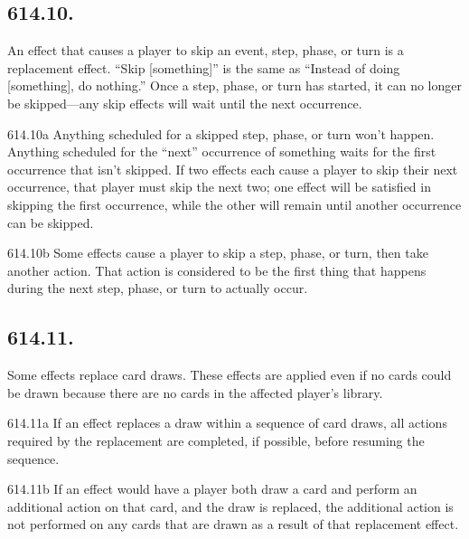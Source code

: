 \subsection*{614.10.}
An effect that causes a player to skip an event, step, phase, or turn is a replacement effect. “Skip [something]” is the same as “Instead of doing [something], do nothing.” Once a step, phase, or turn has started, it can no longer be skipped—any skip effects will wait until the next occurrence.

614.10a Anything scheduled for a skipped step, phase, or turn won’t happen. Anything scheduled for the “next” occurrence of something waits for the first occurrence that isn’t skipped. If two effects each cause a player to skip their next occurrence, that player must skip the next two; one effect will be satisfied in skipping the first occurrence, while the other will remain until another occurrence can be skipped.

614.10b Some effects cause a player to skip a step, phase, or turn, then take another action. That action is considered to be the first thing that happens during the next step, phase, or turn to actually occur.

\subsection*{614.11.}
Some effects replace card draws. These effects are applied even if no cards could be drawn because there are no cards in the affected player’s library.

614.11a If an effect replaces a draw within a sequence of card draws, all actions required by the replacement are completed, if possible, before resuming the sequence.

614.11b If an effect would have a player both draw a card and perform an additional action on that card, and the draw is replaced, the additional action is not performed on any cards that are drawn as a result of that replacement effect.

